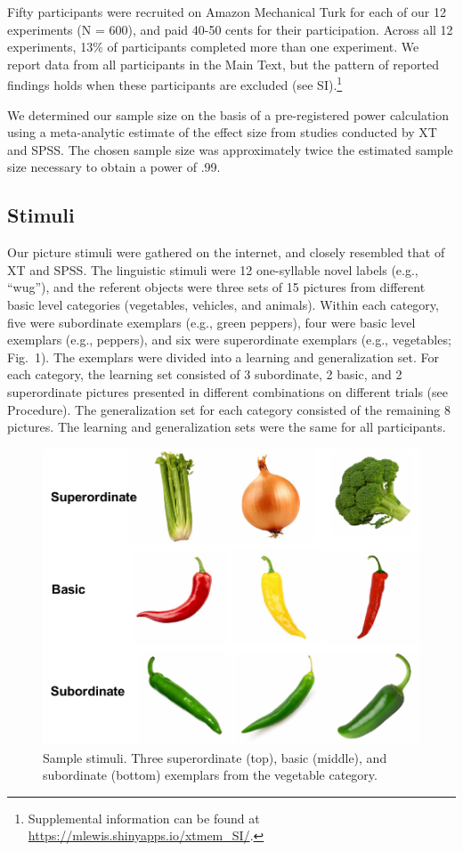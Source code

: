 \documentclass[english,floatsintext,man]{apa6}
\theoremstyle{definition}
\theoremstyle{definition}
\theoremstyle{remark}
\begin{document}
Fifty participants were recruited on Amazon Mechanical Turk for each of
our 12 experiments (N = 600), and paid 40-50 cents for their
participation. Across all 12 experiments, 13\% of participants completed
more than one experiment. We report data from all participants in the
Main Text, but the pattern of reported findings holds when these
participants are excluded (see
SI).\footnote{Supplemental information can be found at \url{https://mlewis.shinyapps.io/xtmem_SI/}.}

We determined our sample size on the basis of a pre-registered power
calculation using a meta-analytic estimate of the effect size from
studies conducted by XT and SPSS. The chosen sample size was
approximately twice the estimated sample size necessary to obtain a
power of .99.

\subsection{Stimuli}\label{stimuli}

Our picture stimuli were gathered on the internet, and closely resembled
that of XT and SPSS. The linguistic stimuli were 12 one-syllable novel
labels (e.g., \enquote{wug}), and the referent objects were three sets
of 15 pictures from different basic level categories (vegetables,
vehicles, and animals). Within each category, five were subordinate
exemplars (e.g., green peppers), four were basic level exemplars (e.g.,
peppers), and six were superordinate exemplars (e.g., vegetables;
Fig.~1). The exemplars were divided into a learning and generalization
set. For each category, the learning set consisted of 3 subordinate, 2
basic, and 2 superordinate pictures presented in different combinations
on different trials (see Procedure). The generalization set for each
category consisted of the remaining 8 pictures. The learning and
generalization sets were the same for all participants.

\begin{figure}[t!]

{\centering \includegraphics[width=0.5\linewidth]{figs/stim} 

}

\caption{Sample stimuli. Three superordinate (top), basic (middle), and subordinate (bottom) exemplars from the vegetable category.}\label{fig:unnamed-chunk-1}
\end{figure}
\end{document}
